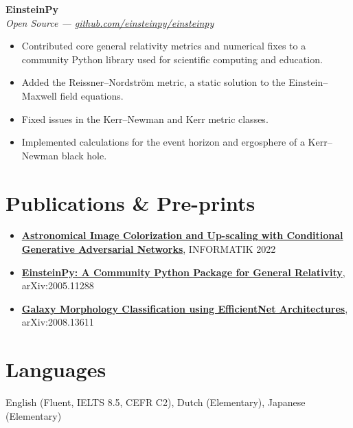 \documentclass[10pt,a4paper]{article}
\newcommand{\resumeheading}[4]{%
  \textbf{#1} \hfill #2\\[-0.15em]
  \textit{#3} \hfill \textit{#4}\\[-1.5em]
}
\begin{document}
\resumeheading
{EinsteinPy}
{}
{Open Source --- \href{https://github.com/einsteinpy/einsteinpy}{github.com/einsteinpy/einsteinpy}}
{}
\begin{itemize}
	\item Contributed core general relativity metrics and numerical fixes to a community Python library used for scientific computing and education.
	\item Added the Reissner–Nordström metric, a static solution to the Einstein–Maxwell field equations.
	\item Fixed issues in the Kerr–Newman and Kerr metric classes.
	\item Implemented calculations for the event horizon and ergosphere of a Kerr–Newman black hole.
\end{itemize}

\section*{Publications \& Pre-prints}
\begin{itemize}
	\item \textbf{\href{https://dl.gi.de/items/0ff89330-3adf-49b3-8071-53eb7f176488}{Astronomical Image Colorization and Up-scaling with Conditional Generative Adversarial Networks}}, INFORMATIK 2022
	\item \textbf{\href{https://arxiv.org/abs/2005.11288}{EinsteinPy: A Community Python Package for General Relativity}}, arXiv:2005.11288
	\item \textbf{\href{https://arxiv.org/abs/2008.13611}{Galaxy Morphology Classification using EfficientNet Architectures}}, arXiv:2008.13611
\end{itemize}

\section*{Languages}
English (Fluent, IELTS 8.5, CEFR C2), Dutch (Elementary), Japanese (Elementary)
\end{document}
